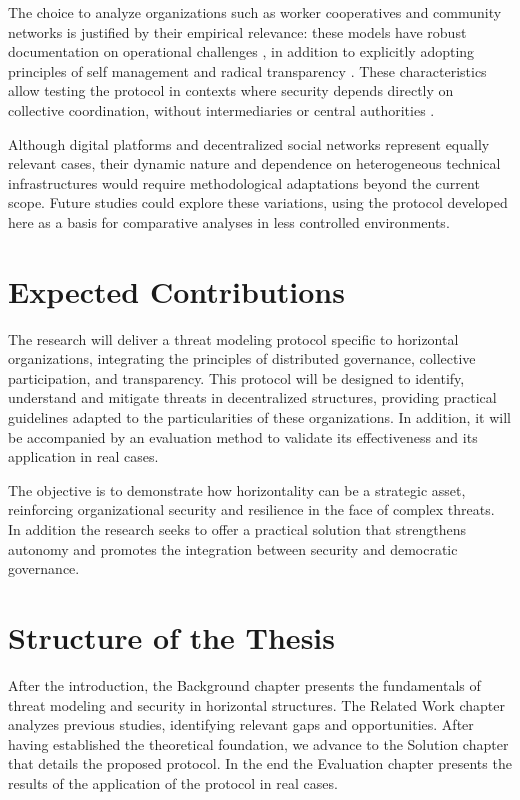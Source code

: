 The choice to analyze organizations such as worker cooperatives and community
networks is justified by their empirical relevance: these models have robust
documentation on operational challenges \cite{WorkerCooperativesinAmerica}, in
addition to explicitly adopting principles of self management and radical
transparency \cite{EverydayRevolutions}. These characteristics allow testing the
protocol in contexts where security depends directly on collective coordination,
without intermediaries or central authorities
\cite{ThreatModelingdesigningForSecurity}.

Although digital platforms and decentralized social networks
\cite{CreatingTheCollectiveSocialMedia} represent equally relevant cases, their
dynamic nature and dependence on heterogeneous technical infrastructures would
require methodological adaptations beyond the current scope. Future studies
could explore these variations, using the protocol developed here as a basis for
comparative analyses in less controlled environments.


\section{Expected Contributions}
\label{sec:expected_contributions}

The research will deliver a threat modeling protocol specific to horizontal
organizations, integrating the principles of distributed governance, collective
participation, and transparency. This protocol will be designed to
identify, understand and mitigate threats in decentralized structures, providing
practical guidelines adapted to the particularities of these organizations. In
addition, it will be accompanied by an evaluation method to validate its
effectiveness and its application in real cases.

The objective is to demonstrate how horizontality can be a strategic
asset, reinforcing organizational security and resilience in the face of complex
threats. In addition the research seeks to offer a practical solution that
strengthens autonomy and promotes the integration between security and
democratic governance.

\section{Structure of the Thesis}
\label{sec:structure_thesis}

After the introduction, the Background chapter presents the fundamentals of
threat modeling and security in horizontal structures. The Related Work chapter
analyzes previous studies, identifying relevant gaps and opportunities. After
having established the theoretical foundation, we advance to the Solution
chapter that details the proposed protocol. In the end the Evaluation chapter
presents the results of the application of the protocol in real cases.

